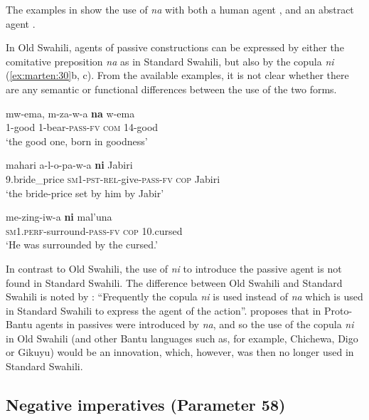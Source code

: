 \documentclass[output=paper]{langscibook}
\begin{document}
The examples in  show the use of \textit{na} with both a human agent , and an abstract agent .

  In Old Swahili, agents of passive constructions can be expressed by either the comitative preposition \textit{na}  as in Standard Swahili, but also by the copula \textit{ni} (\ref{ex:marten:30}b, c). From the available examples, it is not clear whether there are any semantic or functional differences between the use of the two forms. 

\ea\label{ex:marten:30} 
    \ea\label{ex:marten:30a} \gll  mw-ema,   m-za-w-a       \textbf{na}   w-ema\\
    1-good    1-bear-\textsc{pass-fv}  \textsc{com}  14-good\\
    \glt ‘the good one, born in goodness’ \citep[196]{Miehe1979}

    \ex\label{ex:marten:30b} \gll  mahari         a-l-o-pa-w-a             \textbf{ni}     Jabiri\\
    9.bride\_price    \textsc{sm1-pst-rel}{}-give-\textsc{pass-fv}  \textsc{cop}  Jabiri\\
    \glt ‘the bride-price set by him by Jabir’ \citep[196]{Miehe1979}

    \ex\label{ex:marten:30c} \gll  me-zing-iw-a               \textbf{ni}     mal’una\\
    \textsc{sm1.perf}{}-surround-\textsc{pass-fv}    \textsc{cop}  10.cursed\\
    \glt ‘He was surrounded by the cursed.’~\citep[196]{Miehe1979}
    \z
\z

In contrast to Old Swahili, the use of \textit{ni} to introduce the passive agent is not found in Standard Swahili. The difference between Old Swahili and Standard Swahili is noted by \citet[197]{Miehe1979}: ``Frequently the copula \textit{ni} is used instead of \textit{na} which is used in Standard Swahili to express the agent of the action''. \citet[116]{Meeussen1967} proposes that in Proto-Bantu agents in passives were introduced by \textit{na}, and so the use of the copula \textit{ni} in Old Swahili (and other Bantu languages such as, for example, Chichewa, Digo or Gikuyu) would be an innovation, which, however, was then no longer used in Standard Swahili.

\subsection{Negative imperatives (Parameter 58)}\label{sec:marten:3.5}
\end{document}

